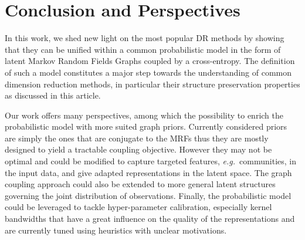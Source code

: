 \section{Conclusion and Perspectives}\label{Perspectives}

In this work, we shed new light on the most popular DR methods by showing that they can be unified within a common probabilistic model in the form of latent Markov Random Fields Graphs coupled by a cross-entropy. The definition of such a model constitutes a major step towards the understanding of common dimension reduction methods, in particular their structure preservation properties as discussed in this article. 

Our work offers many perspectives, among which the possibility to enrich the probabilistic model with more suited graph priors. Currently considered priors are simply the ones that are conjugate to the MRFs thus they are mostly designed to yield a tractable coupling objective. However they may not be optimal and could be modified to capture targeted features, \textit{e.g.}\ communities, in the input data, and give adapted representations in the latent space. The graph coupling approach could also be extended to more general latent structures governing the joint distribution of observations.
Finally, the probabilistic model could be leveraged to tackle hyper-parameter calibration, especially kernel bandwidths that have a great influence on the quality of the representations and are currently tuned using heuristics with unclear motivations.
